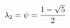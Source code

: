 \documentclass[preview]{standalone}
\begin{document}
\begin{align*}
\special{dvisvgm:raw <g id='unique000'>}\lambda_2 = \psi = \frac{1 - \sqrt{5}}{2}\special{dvisvgm:raw </g>}
\end{align*}
\end{document}

